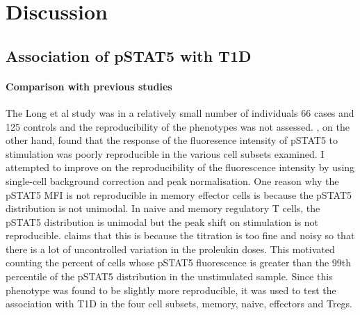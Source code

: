 \section{Discussion}


\subsection{Association of pSTAT5 with T1D}

\paragraph{Comparison with previous studies}

The Long et al study was in a relatively small number of individuals 66 cases and 125 controls and the reproducibility of the phenotypes was not assessed.
, on the other hand, found that the response of the fluoresence intensity of pSTAT5 to stimulation was poorly reproducible in the various cell subsets
examined.  I attempted to improve on the reproducibility of the fluorescence intensity by using single-cell background correction and peak normalisation.
One reason why the pSTAT5 MFI is not reproducible in memory effector cells is because the pSTAT5 distribution is not unimodal.
In naive and memory regulatory T cells, the pSTAT5 distribution is unimodal but the peak shift on stimulation is not reproducible.
 claims that this is because the titration is too fine and noisy so that there is a lot of uncontrolled variation in the proleukin doses.
This motivated counting the percent of cells whose pSTAT5 fluorescence is greater than the 99th percentile of the pSTAT5 distribution in the unstimulated sample.
Since this phenotype was found to be slightly more reproducible, it was used to test the association with T1D in the four cell subsets, memory, naive, effectors and Tregs.





